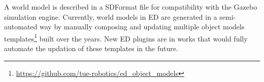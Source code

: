 A world model is described in a SDFormat file for compatibility with the Gazebo simulation engine.
Currently, world models in ED are generated in a semi-automated way by manually composing and updating multiple object models templates\footnote{\url{https://github.com/tue-robotics/ed_object_models}} built over the years.
New ED plugins are in works that would fully automate the updation of these templates in the future.
 